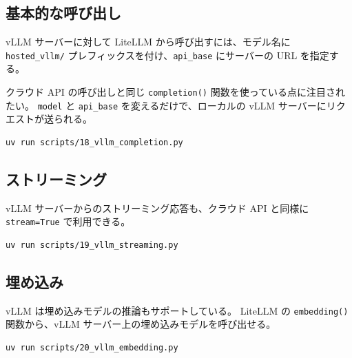 \documentclass[a4paper,11pt]{ltjsarticle}
\newcommand{\code}[1]{\texttt{#1}}
\begin{document}
\subsection{基本的な呼び出し}
\label{subsec:vllm_completion}

vLLM サーバーに対して LiteLLM から呼び出すには、モデル名に \code{hosted\_vllm/} プレフィックスを付け、\code{api\_base} にサーバーの URL を指定する。



クラウド API の呼び出しと同じ \code{completion()} 関数を使っている点に注目されたい。
\code{model} と \code{api\_base} を変えるだけで、ローカルの vLLM サーバーにリクエストが送られる。

\begin{lstlisting}[style=bash]
uv run scripts/18_vllm_completion.py
\end{lstlisting}

\subsection{ストリーミング}
\label{subsec:vllm_streaming}

vLLM サーバーからのストリーミング応答も、クラウド API と同様に \code{stream=True} で利用できる。



\begin{lstlisting}[style=bash]
uv run scripts/19_vllm_streaming.py
\end{lstlisting}

\subsection{埋め込み}
\label{subsec:vllm_embedding}

vLLM は埋め込みモデルの推論もサポートしている。
LiteLLM の \code{embedding()} 関数から、vLLM サーバー上の埋め込みモデルを呼び出せる。



\begin{lstlisting}[style=bash]
uv run scripts/20_vllm_embedding.py
\end{lstlisting}
\end{document}
